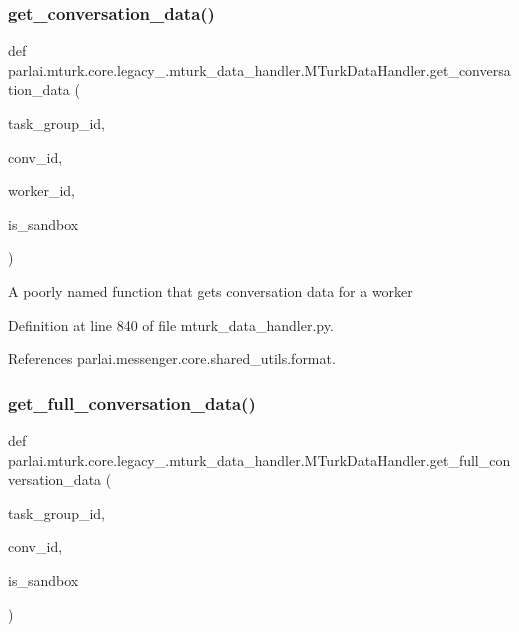 \subsubsection{\texorpdfstring{get\+\_\+conversation\+\_\+data()}{get\_conversation\_data()}}
{\footnotesize\ttfamily def parlai.\+mturk.\+core.\+legacy\+\_.\+mturk\+\_\+data\+\_\+handler.\+M\+Turk\+Data\+Handler.\+get\+\_\+conversation\+\_\+data (\begin{DoxyParamCaption}\item[{}]{task\+\_\+group\+\_\+id,  }\item[{}]{conv\+\_\+id,  }\item[{}]{worker\+\_\+id,  }\item[{}]{is\+\_\+sandbox }\end{DoxyParamCaption})\hspace{0.3cm}{\ttfamily [static]}}

\begin{DoxyVerb}A poorly named function that gets conversation data for a worker\end{DoxyVerb}
 

Definition at line 840 of file mturk\+\_\+data\+\_\+handler.\+py.



References parlai.\+messenger.\+core.\+shared\+\_\+utils.\+format.

\mbox{\label{classparlai_1_1mturk_1_1core_1_1legacy__2018_1_1mturk__data__handler_1_1MTurkDataHandler_a525c02fdb0cfb16a780b0aa8ac787a57}} 
\subsubsection{\texorpdfstring{get\+\_\+full\+\_\+conversation\+\_\+data()}{get\_full\_conversation\_data()}}
{\footnotesize\ttfamily def parlai.\+mturk.\+core.\+legacy\+\_.\+mturk\+\_\+data\+\_\+handler.\+M\+Turk\+Data\+Handler.\+get\+\_\+full\+\_\+conversation\+\_\+data (\begin{DoxyParamCaption}\item[{}]{task\+\_\+group\+\_\+id,  }\item[{}]{conv\+\_\+id,  }\item[{}]{is\+\_\+sandbox }\end{DoxyParamCaption})\hspace{0.3cm}{\ttfamily [static]}}

